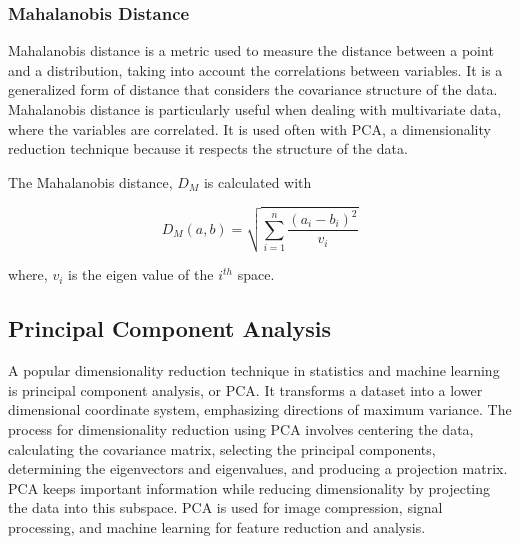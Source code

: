 \subsubsection{Mahalanobis Distance}
\label{sec:mahalanobis_dist}

Mahalanobis distance is a metric used to measure the distance between a point and a distribution, taking into
account the correlations between variables. It is a generalized form of distance that considers the covariance
structure of the data. Mahalanobis distance is particularly useful when dealing with multivariate data, where the
variables are correlated. It is used often with PCA, a dimensionality reduction technique because it respects the
structure of the data.

The Mahalanobis distance, $D_M$ is calculated with

\begin{equation}
  D_M(a, b) = \sqrt{ \sum_{i=1}^{n} \frac{(a_i - b_i)^2}{v_i} }
  \label{eq:mahalanobis_distance}
\end{equation}

where, $v_i$ is the eigen value of the $i^{th}$ space.

\subsection{Principal Component Analysis}
\label{sec:pca}

A popular dimensionality reduction technique in statistics and machine learning is principal component analysis, or
PCA. It transforms a dataset into a lower dimensional coordinate system, emphasizing directions of maximum variance.
The process for dimensionality reduction using PCA involves centering the data, calculating the covariance matrix,
selecting the principal components, determining the eigenvectors and eigenvalues, and producing a projection matrix.
PCA keeps important information while reducing dimensionality by projecting the data into this subspace. PCA is used
for image compression, signal processing, and machine learning for feature reduction and analysis.
